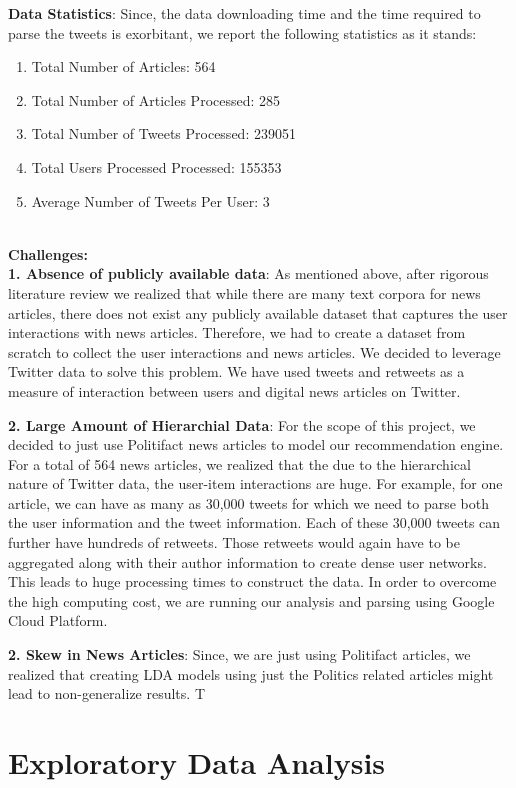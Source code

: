\documentclass{article}
\begin{document}
\textbf{Data Statistics}:
Since, the data downloading time and the time required to parse the tweets is exorbitant, we report the following statistics as it stands:

\begin{enumerate}
\item Total Number of Articles: 564
\item Total Number of Articles Processed: 285
\item Total Number of Tweets Processed: 239051
\item Total Users Processed Processed: 155353
\item Average Number of Tweets Per User: 3
\end{enumerate}\\

\textbf{Challenges:}\\
\textbf{1. Absence of publicly available data}: As mentioned above, after rigorous literature review we realized that while there are many text corpora for news articles, there does not exist any publicly available dataset that captures the user interactions with news articles. Therefore, we had to create a dataset from scratch to collect the user interactions and news articles. We decided to leverage Twitter data to solve this problem. We have used tweets and retweets as a measure of interaction between users and digital news articles on Twitter.

\textbf{2. Large Amount of Hierarchial Data}: For the scope of this project, we decided to just use Politifact news articles to model our recommendation engine. For a total of 564 news articles, we realized that the due to the hierarchical nature of Twitter data, the user-item interactions are huge. For example, for one article, we can have as many as 30,000 tweets for which we need to parse both the user information and the tweet information. Each of these 30,000 tweets can further have hundreds of retweets. Those retweets would again have to be aggregated along with their author information to create dense user networks. This leads to huge processing times to construct the data. In order to overcome the high computing cost, we are running our analysis and parsing using Google Cloud Platform.

\textbf{2. Skew in News Articles}: Since, we are just using Politifact articles, we realized that creating LDA models using just the Politics related articles might lead to non-generalize results. T  


\section{Exploratory Data Analysis}
\end{document}
